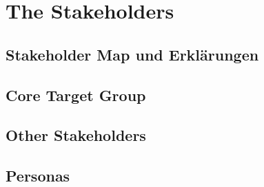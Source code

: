 \chapter{The Stakeholders}

\section{Stakeholder Map und Erklärungen}

\section{Core Target Group}

\section{Other Stakeholders}

\section{Personas}
